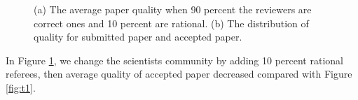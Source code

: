 \documentclass[11pt]{article}
\begin{document}
\begin{figure}[H]
    \centering
    \qquad
    \caption{(a) The average paper quality when 90 percent the reviewers are correct ones and 10 percent are rational. (b) The distribution of quality for submitted paper and accepted paper.}
    \label{fig:t2}
\end{figure}

In Figure \ref{fig:t2}, we change the scientists community by adding 10 percent rational referees, then average quality of accepted paper decreased compared with Figure \ref{fig:t1}.
\end{document}

